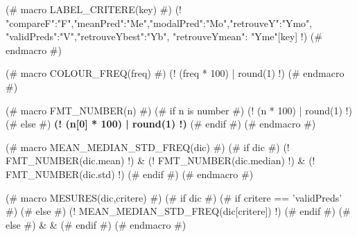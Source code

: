 (# macro LABEL_CRITERE(key) #)
{\small (! {"compareF":"F","meanPred":"Me","modalPred":"Mo","retrouveY":"Ymo",
"validPreds":"V","retrouveYbest":"Yb", "retrouveYmean": "Yme"}[key] !)  }
(# endmacro #)

(# macro COLOUR_FREQ(freq) #)
\textcolor[rgb]{ (! 2 * (1.1 - freq)  | round(3) !) , (! (2 * freq - 1.3) | round(3)  !) , 0.1}{(! (freq * 100) | round(1) !)}
(# endmacro #)

(# macro FMT_NUMBER(n) #)
    (# if n is number #)
(! (n * 100) | round(1) !)
    (# else #)
\textbf{ (! (n[0] * 100) | round(1) !)}
    (# endif #)
(# endmacro #)


(#  macro MEAN_MEDIAN_STD_FREQ(dic) #)
    (# if dic #)
    (! FMT_NUMBER(dic.mean) !) & {\footnotesize (! FMT_NUMBER(dic.median) !)} & {\footnotesize (! FMT_NUMBER(dic.std)  !) }
    (# endif #)
(# endmacro #)


(#  macro MESURES(dic,critere) #)
(# if dic #)
    (# if critere == 'validPreds' #)
    (# else #)
    (!  MEAN_MEDIAN_STD_FREQ(dic[critere]) !)
    (# endif #)
(# else #)
& &
(# endif #)
(# endmacro #)
